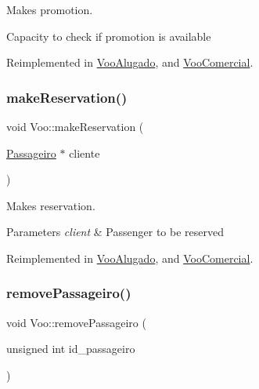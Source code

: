 Makes promotion. 

Capacity to check if promotion is available 

Reimplemented in \hyperlink{class_voo_alugado_a0177e4dc4b81737dab75b41d765c2785}{Voo\+Alugado}, and \hyperlink{class_voo_comercial_a08756e081cbce8c76cc29a3ffec15aab}{Voo\+Comercial}.

\mbox{\label{class_voo_aa308fcf651fdf54b0a03e881c6d8fea4}} 
\subsubsection{\texorpdfstring{make\+Reservation()}{makeReservation()}}
{\footnotesize\ttfamily void Voo\+::make\+Reservation (\begin{DoxyParamCaption}\item[{\hyperlink{class_passageiro}{Passageiro} $\ast$}]{cliente }\end{DoxyParamCaption})\hspace{0.3cm}{\ttfamily [virtual]}}



Makes reservation. 


\begin{DoxyParams}{Parameters}
{\em client} & Passenger to be reserved \\
\hline
\end{DoxyParams}


Reimplemented in \hyperlink{class_voo_alugado_a5b146c059f3ffba9a2e2e843d6999d0a}{Voo\+Alugado}, and \hyperlink{class_voo_comercial_ad72f20dbbaa0862e100b4f7b4ebf78d2}{Voo\+Comercial}.

\mbox{\label{class_voo_ad0c67dc3c01f30746e150f26d5bf15ac}} 
\subsubsection{\texorpdfstring{remove\+Passageiro()}{removePassageiro()}}
{\footnotesize\ttfamily void Voo\+::remove\+Passageiro (\begin{DoxyParamCaption}\item[{unsigned int}]{id\+\_\+passageiro }\end{DoxyParamCaption})\hspace{0.3cm}{\ttfamily [virtual]}}



